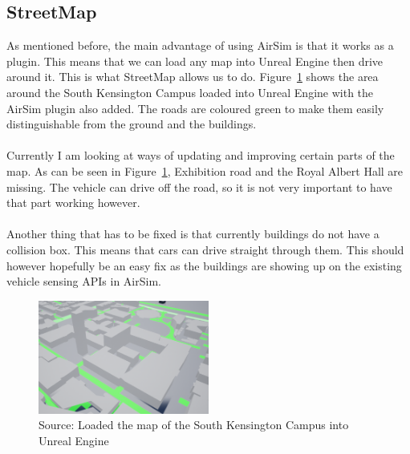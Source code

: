 \subsection{StreetMap}
As mentioned before, the main advantage of using AirSim is that it works as a plugin. This means that we can load any map into Unreal Engine then drive around it. This is what StreetMap allows us to do. Figure~\ref{StreetMapIMG} shows the area around the South Kensington Campus loaded into Unreal Engine with the AirSim plugin also added. The roads are coloured green to make them easily distinguishable from the ground and the buildings. 
\\~\\
Currently I am looking at ways of updating and improving certain parts of the map. As can be seen in Figure~\ref{StreetMapIMG}, Exhibition road and the Royal Albert Hall are missing. The vehicle can drive off the road, so it is not very important to have that part working however.
\\~\\
Another thing that has to be fixed is that currently buildings do not have a collision box. This means that cars can drive straight through them. This should however hopefully be an easy fix as the buildings are showing up on the existing vehicle sensing APIs in AirSim.  

\begin{figure}[H] 
    \centering
    \includegraphics[width=0.5\textwidth]{04_Implementation/Map.png} 
    \caption{Source: Loaded the map of the South Kensington Campus into Unreal Engine}
    \label{StreetMapIMG}
\end{figure}